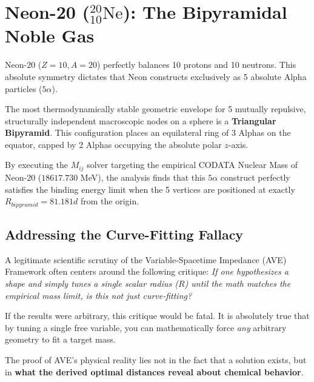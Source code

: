 \chapter{Neon-20 ($^{20}_{10}\text{Ne}$): The Bipyramidal Noble Gas}
\label{ch:neon}

Neon-20 ($Z=10, A=20$) perfectly balances 10 protons and 10 neutrons. This absolute symmetry dictates that Neon constructs exclusively as 5 absolute Alpha particles ($5\alpha$).

The most thermodynamically stable geometric envelope for 5 mutually repulsive, structurally independent macroscopic nodes on a sphere is a \textbf{Triangular Bipyramid}. This configuration places an equilateral ring of 3 Alphas on the equator, capped by 2 Alphas occupying the absolute polar $z$-axis. 

By executing the $M_{ij}$ solver targeting the empirical CODATA Nuclear Mass of Neon-20 ($18617.730$ MeV), the analysis finds that this $5\alpha$ construct perfectly satisfies the binding energy limit when the 5 vertices are positioned at exactly $R_{bipyramid} = 81.181d$ from the origin.

\section{Addressing the Curve-Fitting Fallacy}
A legitimate scientific scrutiny of the Variable-Spacetime Impedance (AVE) Framework often centers around the following critique: \textit{If one hypothesizes a shape and simply tunes a single scalar radius ($R$) until the math matches the empirical mass limit, is this not just curve-fitting?}

If the results were arbitrary, this critique would be fatal. It is absolutely true that by tuning a single free variable, you can mathematically force \textit{any} arbitrary geometry to fit a target mass.

The proof of AVE's physical reality lies not in the fact that a solution exists, but in \textbf{what the derived optimal distances reveal about chemical behavior}.

